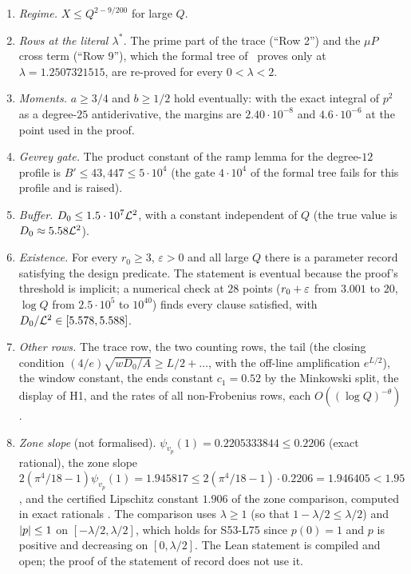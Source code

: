 \begin{enumerate}[label=(\roman*)]
\item \emph{Regime.} $X\le Q^{2-9/200}$ for large $Q$.
\item \emph{Rows at the literal $\lambda^*$.} The prime part of the trace (``Row 2'') and the $\mu P$ cross term (``Row 9''), which the formal tree of~\cite{DSouza}
proves only at $\lambda=1.2507321515$, are re-proved for every $0<\lambda<2$.
\item \emph{Moments.} $a\ge3/4$ and $b\ge1/2$ hold eventually: with the exact integral of $p^2$ as a degree-$25$ antiderivative, the margins are
$2.40\cdot10^{-8}$ and $4.6\cdot10^{-6}$ at the point used in the proof.
\item \emph{Gevrey gate.} The product constant of the ramp lemma for the degree-$12$ profile is $B'\le43{,}447\le5\cdot10^4$ (the gate $4\cdot10^4$ of the
formal tree fails for this profile and is raised).
\item \emph{Buffer.} $D_0\le1.5\cdot10^7\mathcal L^2$, with a constant independent of $Q$ (the true value is $D_0\approx5.58\mathcal L^2$).
\item \emph{Existence.} For every $r_0\ge3$, $\varepsilon>0$ and all large $Q$ there is a parameter record satisfying the design predicate. The statement is
eventual because the proof's threshold is implicit; a numerical check at $28$ points ($r_0+\varepsilon$ from $3.001$ to $20$, $\log Q$ from $2.5\cdot10^5$ to
$10^{40}$) finds every clause satisfied, with $D_0/\mathcal L^2\in[5.578,5.588]$.
\item \emph{Other rows.} The trace row, the two counting rows, the tail (the closing condition $(4/e)\sqrt{wD_0/A}\ge L/2+\dots$, with the off-line
amplification $e^{L/2}$), the window constant, the ends constant $c_1=0.52$ by the Minkowski split, the display of H1, and the rates of all non-Frobenius
rows, each $O((\log Q)^{-\theta})$.
\item \emph{Zone slope} (not formalised). $\psi_{v_p}(1)=0.2205333844\le0.2206$ (exact rational), the zone slope $2(\pi^4/18-1)\psi_{v_p}(1)=1.945817\le2(\pi^4/18-1)\cdot0.2206=1.946405<1.95$,
and the certified Lipschitz constant $1.906$ of the zone comparison, computed in exact rationals \tagN. The comparison uses $\lambda\ge1$ (so that $1-\lambda/2\le\lambda/2$) and $\lvert p\rvert\le1$ on $[-\lambda/2,\lambda/2]$, which holds for
S53-L75 since $p(0)=1$ and $p$ is positive and decreasing on $[0,\lambda/2]$. The Lean statement is compiled and
open; the proof of the statement of record does not use it.
\end{enumerate}
